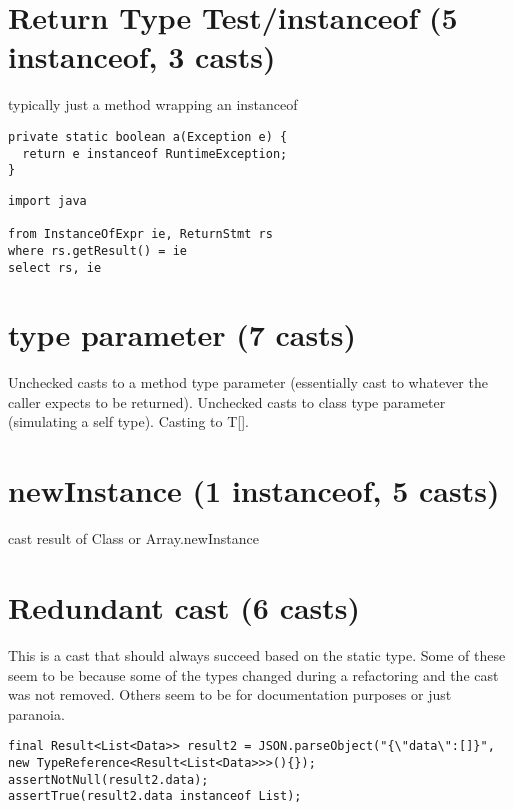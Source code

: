 \section{Return Type Test/instanceof (5 instanceof, 3 casts)}
\label{sec:org5ec6c76}

typically just a method wrapping an instanceof 

\lstset{language=java,label= ,caption= ,captionpos=b,numbers=none}
\begin{lstlisting}
private static boolean a(Exception e) {
  return e instanceof RuntimeException;
}
\end{lstlisting}

\lstset{language=ql,label= ,caption= ,captionpos=b,numbers=none}
\begin{lstlisting}
import java

from InstanceOfExpr ie, ReturnStmt rs
where rs.getResult() = ie
select rs, ie
\end{lstlisting}

\section{type parameter (7 casts)}
\label{sec:org13d3cad}
Unchecked casts to a method type parameter (essentially cast to whatever the caller expects to be returned). Unchecked casts to class type parameter (simulating a self type). Casting to T[]. 

\section{newInstance (1 instanceof, 5 casts)}
\label{sec:orgd045c1f}
cast result of Class or Array.newInstance 

\section{Redundant cast (6 casts)}
\label{sec:orge4a97eb}

This is a cast that should always succeed based on the static type. 
Some of these seem to be because some of the types changed during a refactoring and the cast was not removed.
Others seem to be for documentation purposes or just paranoia. 

\lstset{language=java,label= ,caption= ,captionpos=b,numbers=none}
\begin{lstlisting}
final Result<List<Data>> result2 = JSON.parseObject("{\"data\":[]}", new TypeReference<Result<List<Data>>>(){});
assertNotNull(result2.data);
assertTrue(result2.data instanceof List);
\end{lstlisting}

